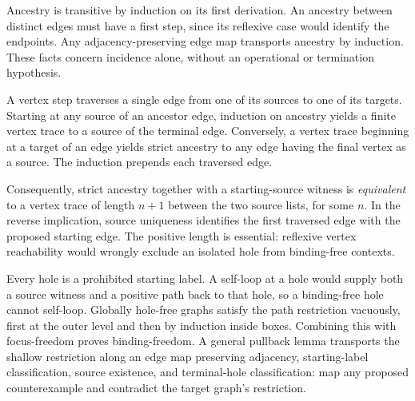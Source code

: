 





Ancestry is transitive by induction on its first derivation. An ancestry
between distinct edges must have a first step, since its reflexive case
would identify the endpoints. Any adjacency-preserving edge map transports
ancestry by induction. These facts concern incidence alone, without an
operational or termination hypothesis.







A vertex step traverses a single edge from one of its sources to one of
its targets. Starting at any source of an ancestor edge, induction on
ancestry yields a finite vertex trace to a source of the terminal edge.
Conversely, a vertex trace beginning at a target of an edge yields strict
ancestry to any edge having the final vertex as a source. The induction
prepends each traversed edge.

Consequently, strict ancestry together with a starting-source witness is
\emph{equivalent} to a vertex trace of length $n+1$ between the two source
lists, for some $n$. In the reverse implication, source uniqueness identifies
the first traversed edge with the proposed starting edge. The positive
length is essential: reflexive vertex reachability would wrongly exclude
an isolated hole from binding-free contexts.









Every hole is a prohibited starting label. A self-loop at a hole would
supply both a source witness and a positive path back to that hole, so a
binding-free hole cannot self-loop. Globally hole-free graphs satisfy the
path restriction vacuously, first at the outer level and then by induction
inside boxes. Combining this with focus-freedom proves binding-freedom.
A general pullback lemma transports the shallow restriction along an edge
map preserving adjacency, starting-label classification, source existence,
and terminal-hole classification: map any proposed counterexample and
contradict the target graph's restriction.

